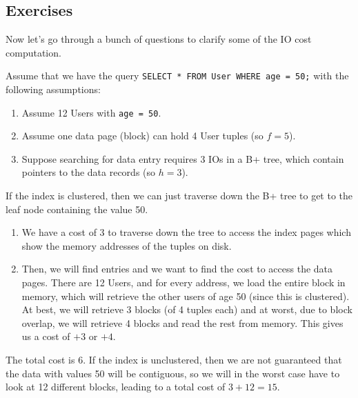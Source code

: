 \documentclass{article}
\begin{document}
  \subsection{Exercises}

    Now let's go through a bunch of questions to clarify some of the IO cost computation. 

    \begin{example}
      Assume that we have the query \texttt{SELECT * FROM User WHERE age = 50;} with the following assumptions: 
      \begin{enumerate}
        \item Assume 12 Users with \texttt{age = 50}. 
        \item Assume one data page (block) can hold 4 User tuples (so $f = 5$). 
        \item Suppose searching for data entry requires 3 IOs in a B+ tree, which contain pointers to the data records (so $h = 3$). 
      \end{enumerate}

      If the index is clustered, then we can just traverse down the B+ tree to get to the leaf node containing the value 50. 
      \begin{enumerate}
        \item We have a cost of 3 to traverse down the tree to access the index pages which show the memory addresses of the tuples on disk. 

        \item Then, we will find entries and we want to find the cost to access the data pages. There are 12 Users, and for every address, we load the entire block in memory, which will retrieve the other users of age 50 (since this is clustered). At best, we will retrieve 3 blocks (of 4 tuples each) and at worst, due to block overlap, we will retrieve 4 blocks and read the rest from memory. This gives us a cost of $+3$ or $+4$. 
      \end{enumerate}
      The total cost is 6. If the index is unclustered, then we are not guaranteed that the data with values 50 will be contiguous, so we will in the worst case have to look at 12 different blocks, leading to a total cost of $3 + 12 = 15$. 
    \end{example}
\end{document}

